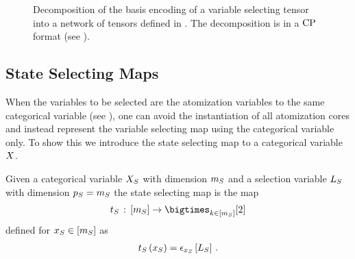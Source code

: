 
\begin{figure}[t]
    \begin{center}
        
    \end{center}
    \caption{Decomposition of the basis encoding of a variable selecting tensor into a network of tensors defined in .
    The decomposition is in a $\mathrm{CP}$ format (see ). %
    }
    \label{fig:SelectorDecomposition}
\end{figure}




\subsection{State Selecting Maps}

When the variables to be selected are the atomization variables to the same categorical variable (see ), one can avoid the instantiation of all atomization cores and instead represent the variable selecting map using the categorical variable only.
To show this we introduce the state selecting map to a categorical variable $X$.

\begin{definition}
    \label{def:stateSelector}
    Given a categorical variable $X_{S}$ with dimension $m_{S}$ and a selection variable $L_{S}$ with dimension $p_{S}=m_{S}$ the state selecting map is the map
    \begin{align*}
        \sselectionmap\defcols[\catdimof{\sselectionsymbol}] \rightarrow \bigtimes_{\catenumerator\in[\catdimof{\sselectionsymbol}]} [2]
    \end{align*}
    defined for $x_{S}\in[m_{S}]$ as
    \begin{align*}
        t_{S}\left(x_{S}\right) = \epsilon_{x_{S}}\left[L_{S}\right] \, .
    \end{align*}
\end{definition}

